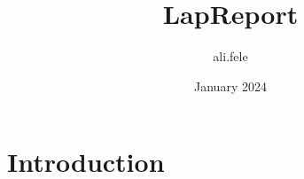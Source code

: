 \documentclass{article}
\title{LapReport}
\author{ali.fele }
\date{January 2024}
\begin{document}
\maketitle

\section{Introduction}
\end{document}
